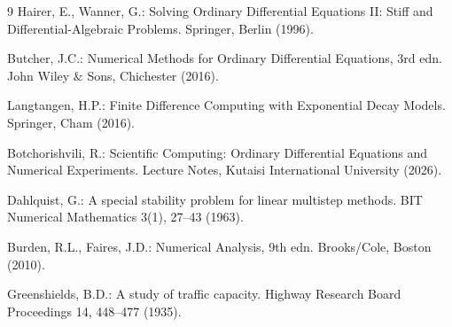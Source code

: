 \documentclass[runningheads]{llncs}
\begin{document}
\begin{thebibliography}{9}
\small
\setlength{\itemsep}{0pt plus 0.5pt}
\setlength{\parsep}{0pt}
Hairer, E., Wanner, G.: Solving Ordinary Differential Equations II: Stiff and Differential-Algebraic Problems. Springer, Berlin (1996).

Butcher, J.C.: Numerical Methods for Ordinary Differential Equations, 3rd edn. John Wiley \& Sons, Chichester (2016).

Langtangen, H.P.: Finite Difference Computing with Exponential Decay Models. Springer, Cham (2016).

Botchorishvili, R.: Scientific Computing: Ordinary Differential Equations and Numerical Experiments. Lecture Notes, Kutaisi International University (2026).

Dahlquist, G.: A special stability problem for linear multistep methods. BIT Numerical Mathematics 3(1), 27--43 (1963).

Burden, R.L., Faires, J.D.: Numerical Analysis, 9th edn. Brooks/Cole, Boston (2010).

Greenshields, B.D.: A study of traffic capacity. Highway Research Board Proceedings 14, 448--477 (1935).
\end{thebibliography}
\end{document}
